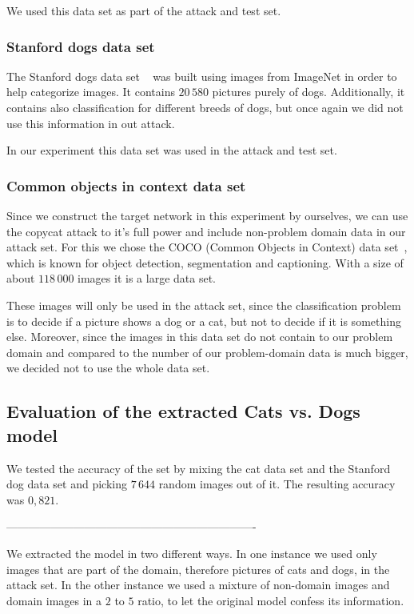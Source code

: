 \documentclass[a4paper,11pt]{article}
\begin{document}
            We used this data set as part of the attack and test set. 
            
        \subsubsection{Stanford dogs data set}
            The Stanford dogs data set ~\cite{dogs} was built using images from ImageNet in order to help categorize images. It contains $20\,580$ pictures purely of dogs. Additionally, it contains also classification for different breeds of dogs, but once again we did not use this information in out attack. 
            
            In our experiment this data set was used in the attack and test set.
            
        \subsubsection{Common objects in context data set}
            Since we construct the target network in this experiment by ourselves, we can use the copycat attack to it's full power and include non-problem domain data in our attack set. 
            For this we chose the COCO (Common Objects in Context) data set~\cite{coco}, which is known for object detection, segmentation and captioning. With a size of about $118\,000$ images it is a large data set. 
            
            These images will only be used in the attack set, since the classification problem is to decide if a picture shows a dog or a cat, but not to decide if it is something else. Moreover, since the images in this data set do not contain to our problem domain and compared to the number of our problem-domain data is much bigger, we decided not to use the whole data set. 
            
    \subsection{Evaluation of the extracted Cats vs. Dogs model}
        We tested the accuracy of the set by mixing the cat data set and the Stanford dog data set and picking $7\,644$ random images out of it. The resulting accuracy was $0,821$.
        
        -------------------------------------------------------------------
        
        We extracted the model in two different ways. In one instance we used only images that are part of the domain, therefore pictures of cats and dogs, in the attack set. In the other instance we used a mixture of non-domain images and domain images in a $2$ to $5$ ratio, to let the original model confess its information. 
    
\end{document}
